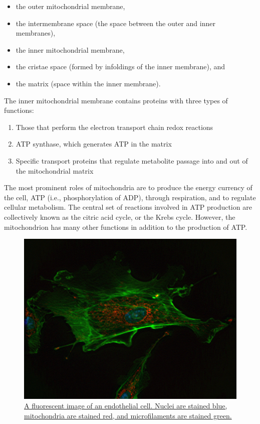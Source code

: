 \begin{itemize}
\tightlist
\item
  the outer mitochondrial membrane,
\item
  the intermembrane space (the space between the outer and inner membranes),
\item
  the inner mitochondrial membrane,
\item
  the cristae space (formed by infoldings of the inner membrane), and
\item
  the matrix (space within the inner membrane).
\end{itemize}

The inner mitochondrial membrane contains proteins with three types of functions:

\begin{enumerate}
\def\labelenumi{\arabic{enumi}.}
\tightlist
\item
  Those that perform the electron transport chain redox reactions
\item
  ATP synthase, which generates ATP in the matrix
\item
  Specific transport proteins that regulate metabolite passage into and out of the mitochondrial matrix
\end{enumerate}

The most prominent roles of mitochondria are to produce the energy currency of the cell, ATP (i.e., phosphorylation of ADP), through respiration, and to regulate cellular metabolism. The central set of reactions involved in ATP production are collectively known as the citric acid cycle, or the Krebs cycle. However, the mitochondrion has many other functions in addition to the production of ATP.



\begin{figure}

{\centering \includegraphics[width=0.7\linewidth]{./figures/cells/DAPIMitoTrackerRedAlexaFluor488BPAE} 

}

\caption{\href{https://commons.wikimedia.org/wiki/File:DAPIMitoTrackerRedAlexaFluor488BPAE.jpg}{A fluorescent image of an endothelial cell. Nuclei are stained blue, mitochondria are stained red, and microfilaments are stained green.}}\label{fig:dapimitotracker}
\end{figure}

